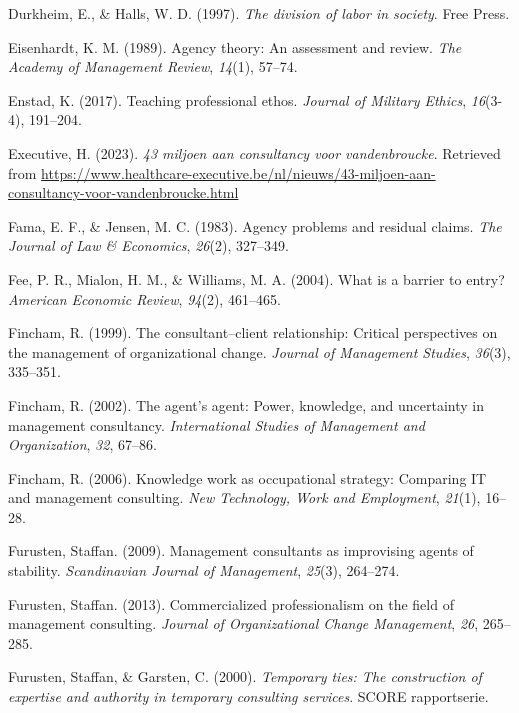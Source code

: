 \documentclass[
  man,floatsintext]{apa6}
\newlength{\cslhangindent}
\newenvironment{CSLReferences}[2] %
 {\begin{list}{}{%
  \setlength{\itemindent}{0pt}
  \setlength{\leftmargin}{0pt}
  \setlength{\parsep}{0pt}
  \ifodd #1
   \setlength{\leftmargin}{\cslhangindent}
   \setlength{\itemindent}{-1\cslhangindent}
  \fi
  \setlength{\itemsep}{#2\baselineskip}}}
 {\end{list}}
\begin{document}
\begin{CSLReferences}{1}{0}
Durkheim, E., \& Halls, W. D. (1997). \emph{The division of labor in society}. Free Press.

Eisenhardt, K. M. (1989). Agency theory: An assessment and review. \emph{The Academy of Management Review}, \emph{14}(1), 57--74.

Enstad, K. (2017). Teaching professional ethos. \emph{Journal of Military Ethics}, \emph{16}(3-4), 191--204.

Executive, H. (2023). \emph{43 miljoen aan consultancy voor vandenbroucke}. Retrieved from \url{https://www.healthcare-executive.be/nl/nieuws/43-miljoen-aan-consultancy-voor-vandenbroucke.html}

Fama, E. F., \& Jensen, M. C. (1983). Agency problems and residual claims. \emph{The Journal of Law \& Economics}, \emph{26}(2), 327--349.

Fee, P. R., Mialon, H. M., \& Williams, M. A. (2004). What is a barrier to entry? \emph{American Economic Review}, \emph{94}(2), 461--465.

Fincham, R. (1999). The consultant--client relationship: Critical perspectives on the management of organizational change. \emph{Journal of Management Studies}, \emph{36}(3), 335--351.

Fincham, R. (2002). The agent's agent: Power, knowledge, and uncertainty in management consultancy. \emph{International Studies of Management and Organization}, \emph{32}, 67--86.

Fincham, R. (2006). Knowledge work as occupational strategy: Comparing IT and management consulting. \emph{New Technology, Work and Employment}, \emph{21}(1), 16--28.

Furusten, Staffan. (2009). Management consultants as improvising agents of stability. \emph{Scandinavian Journal of Management}, \emph{25}(3), 264--274.

Furusten, Staffan. (2013). Commercialized professionalism on the field of management consulting. \emph{Journal of Organizational Change Management}, \emph{26}, 265--285.

Furusten, Staffan, \& Garsten, C. (2000). \emph{Temporary ties: The construction of expertise and authority in temporary consulting services}. SCORE rapportserie.


\end{CSLReferences}
\end{document}

